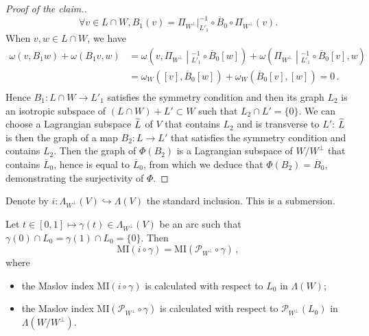 \documentclass[AHL, Unicode, longabstracts, published]{cedram}
\renewcommand*\P{\mathcal{P}}
\newcommand{\MI}{\mathrm{MI}}
\let\oldtilde\tilde
\renewcommand*{\tilde}[1]{\mathchoice{\widetilde{#1}}{\widetilde{#1}}{\oldtilde{#1}}{\oldtilde{#1}}}
\let\oldforall\forall
\renewcommand*{\forall}{\mathrel{\oldforall}}
\begin{document}
\begin{proof}[Proof of the claim.]
\[
\forall v\in L\cap W, B_1(v)=\Pi_{W^\perp}|_{L'_1}^{-1}\circ \overline{B}_0\circ \Pi_{W^\perp}(v).
\]
When $v, w\in L\cap W$, we have
\begin{align*}
\omega(v, B_1w)+\omega(B_1v, w)&=
\omega\left(v,\Pi_{W^\perp}\middle|_{L'_1}^{-1}\circ \overline{B}_0[w]\right) +\omega\left(\Pi_{W^\perp}\middle|_{L'_1}^{-1}\circ \overline{B}_0[v],w\right)\\
&=\omega_W\left([v], \overline{B}_0[w]\right) +\omega_W\left(\overline{B}_0[v],[w]\right)=0\,.\\
\end{align*}
Hence $B_1:L\cap W\to L'_1$ satisfies the symmetry condition and then its graph $L_2$ is an isotropic subspace of $(L\cap W)+L'\subset W$ such that $L_2\cap L'=\{ 0\}$. We can choose a Lagrangian subspace $\tilde L$ of $V$ that contains $L_2$ and is transverse to $L'$: $\tilde L$ is then the graph of a map $B_2:L\to L'$ that satisfies the symmetry condition and contains $L_2$. Then the graph of $\Phi(B_2)$ is a Lagrangian subspace of $W/W^\bot$ that contains $\overline{L}_0$, hence is equal to $\overline{L}_0$, from which we deduce that $\Phi(B_2)=\overline{B}_0$, demonstrating the surjectivity of $\Phi$.
\end{proof}


Denote by $i:\Lambda_{W^\perp}(V)\hookrightarrow\Lambda(V)$ the standard inclusion. This is a submersion.

\begin{lemm}\label{sym red for vec space}
Let $t\in [0,1]\mapsto \gamma(t)\in\Lambda_{W^\perp}(V)$ be an arc such that $\gamma(0)\cap L_0=\gamma(1)\cap L_0=\{0\}$. Then
\[
\MI(i\circ\gamma)=\MI\left(\P_{W^\perp}\circ\gamma\right)\,,
\]
where
\begin{itemize}
\item the Maslov index $ \MI(i\circ\gamma)$ is calculated with respect to $L_0$ in $\Lambda(W)$;
\item the Maslov index $ \MI(\P_{W^\perp}\circ\gamma)$ is calculated with respect to $\P_{W^\perp}(L_0)$ in $\Lambda(W/W^\perp)$.
\end{itemize}
\end{lemm}
\end{document}

